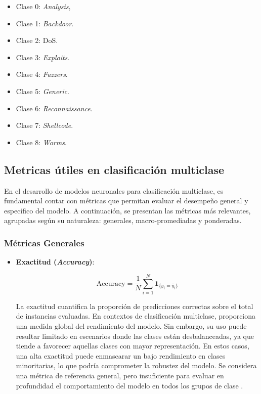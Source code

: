 \begin{itemize}
	\item Clase 0: \textit{Analysis},
	\item Clase 1: \textit{Backdoor}.
	\item Clase 2: DoS.
	\item Clase 3: \textit{Exploits}. 
	\item Clase 4: \textit{Fuzzers}.
	\item Clase 5: \textit{Generic}.
	\item Clase 6: \textit{Reconnaissance}.
	\item Clase 7: \textit{Shellcode}.
	\item Clase 8: \textit{Worms}.
\end{itemize}


\subsection{Metricas útiles en clasificación multiclase} \label{sec:metricas-mul}

En el desarrollo de modelos neuronales para clasificación multiclase, es fundamental contar con métricas que permitan evaluar el desempeño general y específico del modelo. A continuación, se presentan las métricas más relevantes, agrupadas según su naturaleza: generales, macro-promediadas y ponderadas.
\subsubsection*{Métricas Generales}

\begin{itemize}

\item \textbf{Exactitud (\textit{Accuracy})}:

\begin{equation}
\text{Accuracy} = \frac{1}{N} \sum_{i=1}^{N} \mathbf{1}_{\{y_i = \hat{y}_i\}}
\end{equation}

La exactitud cuantifica la proporción de predicciones correctas sobre el total de instancias evaluadas. En contextos de clasificación multiclase, proporciona una medida global del rendimiento del modelo. Sin embargo, su uso puede resultar limitado en escenarios donde las clases están desbalanceadas, ya que tiende a favorecer aquellas clases con mayor representación. En estos casos, una alta exactitud puede enmascarar un bajo rendimiento en clases minoritarias, lo que podría comprometer la robustez del modelo. Se considera una métrica de referencia general, pero insuficiente para evaluar en profundidad el comportamiento del modelo en todos los grupos de clase \cite{Sokolova2006}.

\end{itemize}

